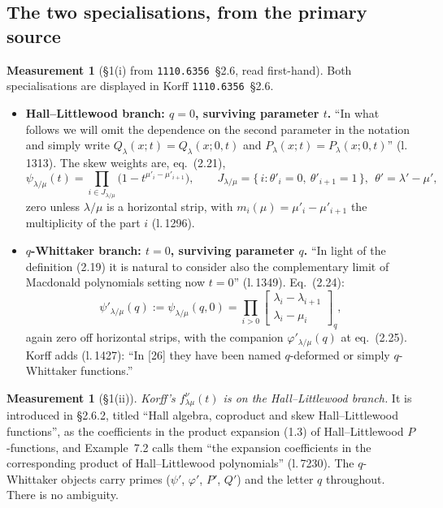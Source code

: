 \documentclass[11pt]{article}
\theoremstyle{plain}
\theoremstyle{definition}
\newtheorem{measurement}[theorem]{Measurement}
\begin{document}
\subsection{The two specialisations, from the primary source}

\begin{measurement}[\S1(i) from \texttt{1110.6356}~\S2.6, read first-hand]\label{m:twobranches}
Both specialisations are displayed in Korff \texttt{1110.6356}~\S2.6.
\begin{itemize}
\item \textbf{Hall--Littlewood branch: $q=0$, surviving parameter $t$.} ``In what follows we
will omit the dependence on the second parameter in the notation and simply write
$Q_\lambda(x;t)=Q_\lambda(x;0,t)$ and $P_\lambda(x;t)=P_\lambda(x;0,t)$'' (l.\,1313). The
skew weights are, eq.~(2.21),
\[
  \psi_{\lambda/\mu}(t)=\prod_{i\in J_{\lambda/\mu}}\bigl(1-t^{\mu'_i-\mu'_{i+1}}\bigr),
  \qquad J_{\lambda/\mu}=\{\,i:\theta'_i=0,\ \theta'_{i+1}=1\,\},\ \ \theta'=\lambda'-\mu',
\]
zero unless $\lambda/\mu$ is a horizontal strip, with $m_i(\mu)=\mu'_i-\mu'_{i+1}$ the
multiplicity of the part $i$ (l.\,1296).
\item \textbf{$q$-Whittaker branch: $t=0$, surviving parameter $q$.} ``In light of the
definition (2.19) it is natural to consider also the complementary limit of Macdonald
polynomials setting now $t=0$'' (l.\,1349). Eq.~(2.24):
\[
  \psi'_{\lambda/\mu}(q):=\psi_{\lambda/\mu}(q,0)
  =\prod_{i>0}\begin{bmatrix}\lambda_i-\lambda_{i+1}\\ \lambda_i-\mu_i\end{bmatrix}_q,
\]
again zero off horizontal strips, with the companion $\varphi'_{\lambda/\mu}(q)$ at
eq.~(2.25). Korff adds (l.\,1427): ``In [26] they have been named $q$-deformed or simply
$q$-Whittaker functions.''
\end{itemize}
\end{measurement}

\begin{measurement}[\S1(ii)]\label{m:fisHL}
\emph{Korff's $f^\nu_{\lambda\mu}(t)$ is on the Hall--Littlewood branch.} It is introduced
in \S2.6.2, titled ``Hall algebra, coproduct and skew Hall--Littlewood functions'', as the
coefficients in the product expansion (1.3) of Hall--Littlewood $P$-functions, and
Example~7.2 calls them ``the expansion coefficients in the corresponding product of
Hall--Littlewood polynomials'' (l.\,7230). The $q$-Whittaker objects carry primes
($\psi'$, $\varphi'$, $P'$, $Q'$) and the letter $q$ throughout. There is no ambiguity.
\end{measurement}
\end{document}
